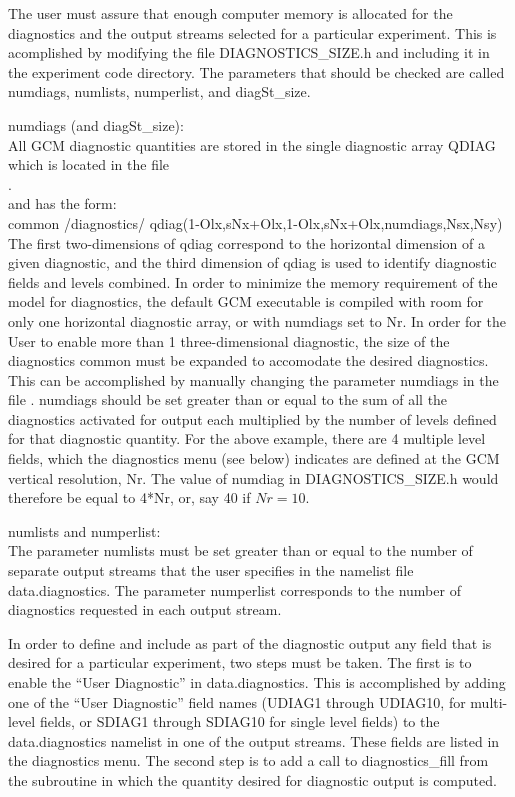 \noindent
The user must assure that enough computer memory is allocated for the diagnostics 
and the output streams selected for a particular experiment.  This is acomplished by
modifying the file DIAGNOSTICS\_SIZE.h and including it in the experiment code directory.
The parameters that should be checked are called numdiags, numlists, numperlist, and
diagSt\_size. 

\noindent numdiags (and diagSt\_size): \\
\noindent All GCM diagnostic quantities are stored in the single diagnostic array QDIAG 
which is located in the file \\ .\\
and has the form:\\
common /diagnostics/ qdiag(1-Olx,sNx+Olx,1-Olx,sNx+Olx,numdiags,Nsx,Nsy) \\
\noindent
The first two-dimensions of qdiag correspond to the horizontal dimension of a given diagnostic, 
and the third dimension of qdiag is used to identify diagnostic fields and levels combined. In 
order to minimize the memory requirement of the model for diagnostics, the default GCM 
executable is compiled with room for only one horizontal diagnostic array, or with
numdiags set to Nr. In order for the User to enable more than 1 three-dimensional diagnostic,
the size of the diagnostics common must be expanded to accomodate the desired diagnostics.
This can be accomplished by manually changing the parameter numdiags in the
file .
numdiags should be set greater than or equal to the sum of all the diagnostics activated
for output each multiplied by the number of levels defined for that diagnostic quantity.
For the above example, there are 4 multiple level fields, which the diagnostics menu
(see below) indicates are defined at the GCM vertical resolution, Nr. The value of
numdiag in DIAGNOSTICS\_SIZE.h would therefore be equal to 4*Nr, or, say 40 if $Nr=10$.

\noindent numlists and numperlist: \\
\noindent The parameter numlists must be set greater than or equal to the number of
separate output streams that the user specifies in the namelist file data.diagnostics.
The parameter numperlist corresponds to the number of diagnostics requested in each
output stream.

\noindent
In order to define and include as part of the diagnostic output any field
that is desired for a particular experiment, two steps must be taken. The
first is to enable the ``User Diagnostic'' in data.diagnostics. This is
accomplished by adding one of the ``User Diagnostic'' field names (UDIAG1 through 
UDIAG10, for multi-level fields, or SDIAG1 through SDIAG10 for single level
fields) to the data.diagnostics namelist in one of the output streams. These 
fields are listed in the diagnostics menu. The second step is to
add a call to diagnostics\_fill from the subroutine in which the quantity
desired for diagnostic output is computed. 

